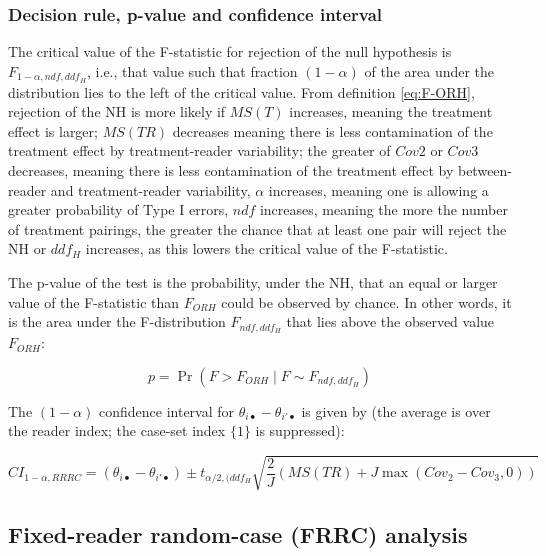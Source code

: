 \documentclass[
]{book}
\begin{document}
\hypertarget{decision-rule-p-value-and-confidence-interval}{%
\subsubsection{Decision rule, p-value and confidence interval}\label{decision-rule-p-value-and-confidence-interval}}

The critical value of the F-statistic for rejection of the null hypothesis is \(F_{1-\alpha,ndf,ddf_H}\), i.e., that value such that fraction \((1-\alpha)\) of the area under the distribution lies to the left of the critical value. From definition \eqref{eq:F-ORH}, rejection of the NH is more likely if \(MS(T)\) increases, meaning the treatment effect is larger; \(MS(TR)\) decreases meaning there is less contamination of the treatment effect by treatment-reader variability; the greater of \(Cov2\) or \(Cov3\) decreases, meaning there is less contamination of the treatment effect by between-reader and treatment-reader variability, \(\alpha\) increases, meaning one is allowing a greater probability of Type I errors, \(ndf\) increases, meaning the more the number of treatment pairings, the greater the chance that at least one pair will reject the NH or \(ddf_H\) increases, as this lowers the critical value of the F-statistic.

The p-value of the test is the probability, under the NH, that an equal or larger value of the F-statistic than \(F_{ORH}\) could be observed by chance. In other words, it is the area under the F-distribution \(F_{ndf,ddf_H}\) that lies above the observed value \(F_{ORH}\):

\begin{equation}
p=\Pr(F>F_{ORH} \mid F\sim F_{ndf,ddf_H})
\label{eq:pValueORHRRRC}
\end{equation}

The \((1-\alpha)\) confidence interval for \(\theta_{i \bullet} - \theta_{i' \bullet}\) is given by (the average is over the reader index; the case-set index \(\{1\}\) is suppressed):

\begin{equation}
CI_{1-\alpha,RRRC}=(\theta_{i \bullet} - \theta_{i' \bullet}) \pm t_{\alpha/2, (ddf_H}\sqrt{\frac{2}{J}(MS(TR)+J\max(Cov_2-Cov_3,0))}
\label{eq:CIalpha-RRRC}
\end{equation}

\hypertarget{fixed-reader-random-case-frrc-analysis-1}{%
\subsection{Fixed-reader random-case (FRRC) analysis}\label{fixed-reader-random-case-frrc-analysis-1}}
\end{document}
